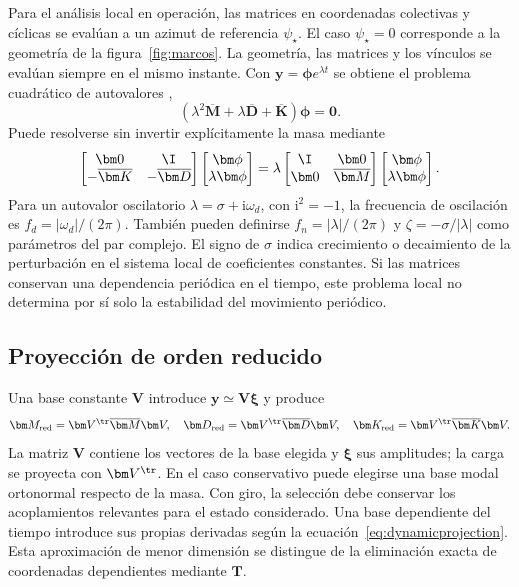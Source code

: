Para el análisis local en operación, las matrices en coordenadas colectivas y cíclicas se evalúan a un azimut de referencia $\psi_\star$. El caso $\psi_\star=0$ corresponde a la geometría de la figura~\ref{fig:marcos}. La geometría, las matrices y los vínculos se evalúan siempre en el mismo instante. Con $\bm y=\bm\phi e^{\lambda t}$ se obtiene el problema cuadrático de autovalores \citep{tisseur2001},
\begin{equation}
(\lambda^2\overline{\bm M}+\lambda\overline{\bm D}+\overline{\bm K})\bm\phi=\bm0.
\label{eq:QEP}
\end{equation}
Puede resolverse sin invertir explícitamente la masa mediante
\begin{equation}
\begin{bmatrix}\bm0&\I\\-\overline{\bm K}&-\overline{\bm D}\end{bmatrix}
\begin{bmatrix}\bm\phi\\\lambda\bm\phi\end{bmatrix}
=\lambda\begin{bmatrix}\I&\bm0\\\bm0&\overline{\bm M}\end{bmatrix}
\begin{bmatrix}\bm\phi\\\lambda\bm\phi\end{bmatrix}.
\end{equation}
Para un autovalor oscilatorio $\lambda=\sigma+\mathrm i\omega_d$, con $\mathrm i^2=-1$, la frecuencia de oscilación es $f_d=|\omega_d|/(2\pi)$. También pueden definirse $f_n=|\lambda|/(2\pi)$ y $\zeta=-\sigma/|\lambda|$ como parámetros del par complejo. El signo de $\sigma$ indica crecimiento o decaimiento de la perturbación en el sistema local de coeficientes constantes. Si las matrices conservan una dependencia periódica en el tiempo, este problema local no determina por sí solo la estabilidad del movimiento periódico.

\subsection{Proyección de orden reducido}
Una base constante $\bm V$ introduce $\bm y\simeq\bm V\bm\xi$ y produce
\begin{equation}
\bm M_{\rm red}=\bm V^\tr\overline{\bm M}\bm V,\quad
\bm D_{\rm red}=\bm V^\tr\overline{\bm D}\bm V,\quad
\bm K_{\rm red}=\bm V^\tr\overline{\bm K}\bm V.
\end{equation}
La matriz $\bm V$ contiene los vectores de la base elegida y $\bm\xi$ sus amplitudes; la carga se proyecta con $\bm V^\tr$. En el caso conservativo puede elegirse una base modal ortonormal respecto de la masa. Con giro, la selección debe conservar los acoplamientos relevantes para el estado considerado. Una base dependiente del tiempo introduce sus propias derivadas según la ecuación~\eqref{eq:dynamicprojection}. Esta aproximación de menor dimensión se distingue de la eliminación exacta de coordenadas dependientes mediante $\bm T$.


